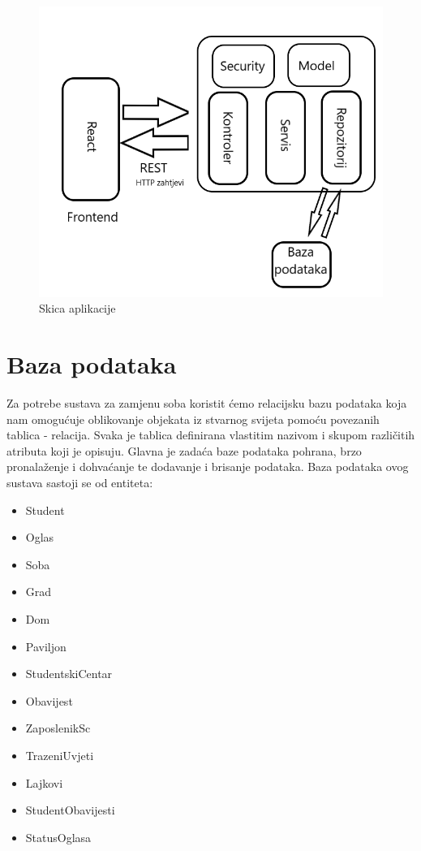 \begin{figure}[H]
\includegraphics[scale=0.4]{slike/Skica_aplikacije.png} %
\centering
\caption{Skica aplikacije}
\label{fig:aplikacija}
\end{figure}


	
		

		

				
		\section{Baza podataka}

        		Za potrebe sustava za zamjenu soba koristit ćemo relacijsku bazu podataka koja nam omogućuje oblikovanje objekata iz stvarnog svijeta pomoću povezanih tablica - relacija. Svaka je tablica definirana vlastitim nazivom i skupom različitih atributa koji je opisuju. Glavna je zadaća baze podataka pohrana, brzo pronalaženje i dohvaćanje te dodavanje i brisanje podataka. Baza podataka ovog sustava sastoji se od entiteta:
        		\begin{itemize}
        			\item Student
        			\item Oglas
        			\item Soba
        			\item Grad
        			\item Dom
        			\item Paviljon
        			\item StudentskiCentar
        			\item Obavijest
        			\item ZaposlenikSc
        			\item TrazeniUvjeti
        			\item Lajkovi
        			\item StudentObavijesti
        			\item StatusOglasa

        		\end{itemize}

